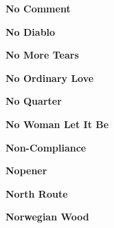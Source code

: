 \begin{center}\textbf{No Comment}\end{center}
\newline
\vspace{10pt} 
\begin{center}\textbf{No Diablo}\end{center}
\newline
\vspace{10pt} 
\begin{center}\textbf{No More Tears}\end{center}
\newline
\vspace{10pt} 
\begin{center}\textbf{No Ordinary Love}\end{center}
\newline
\vspace{10pt} 
\begin{center}\textbf{No Quarter}\end{center}
\newline
\vspace{10pt} 
\begin{center}\textbf{No Woman Let It Be}\end{center}
\newline
\vspace{10pt} 
\begin{center}\textbf{Non-Compliance}\end{center}
\newline
\vspace{10pt} 
\begin{center}\textbf{Nopener}\end{center}
\newline
\vspace{10pt} 
\begin{center}\textbf{North Route}\end{center}
\newline
\vspace{10pt} 
\begin{center}\textbf{Norwegian Wood}\end{center}
\newline
